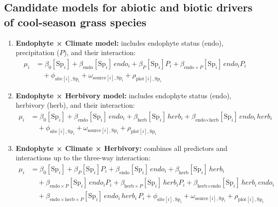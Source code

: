 \documentclass[12pt]{article}\usepackage[]{graphicx}\usepackage[dvipsnames]{xcolor}
\begin{document}
\subsection*{Candidate models for abiotic and biotic drivers of cool-season grass species} \label{sec:models}
\begin{enumerate}
    \item \textbf{Endophyte × Climate model:} includes endophyte status ($\text{endo}$), precipitation ($P$), and their interaction:
    \begin{align*}
    \mu_i &= \beta_0[\text{Sp}_i] + \beta_{\text{endo}}[\text{Sp}_i]\,endo_i + \beta_P[\text{Sp}_i] P_i 
            + \beta_{\text{endo}\times P}[\text{Sp}_i]\,endo_i P_i \\
    &\quad + \phi_{\text{site}[i],\text{Sp}_i} + \omega_{\text{source}[i],\text{Sp}_i} + \rho_{\text{plot}[i],\text{Sp}_i}
    \end{align*}

    \item \textbf{Endophyte × Herbivory model:} includes endophyte status ($\text{endo}$), herbivory ($\text{herb}$), and their interaction:
    \begin{align*}
    \mu_i &= \beta_0[\text{Sp}_i] + \beta_{\text{endo}}[\text{Sp}_i]\,endo_i + \beta_{\text{herb}}[\text{Sp}_i]\,herb_i 
            + \beta_{\text{endo}\times \text{herb}}[\text{Sp}_i]\,endo_i\,herb_i \\
    &\quad + \phi_{\text{site}[i],\text{Sp}_i} + \omega_{\text{source}[i],\text{Sp}_i} + \rho_{\text{plot}[i],\text{Sp}_i}
    \end{align*}

    \item \textbf{Endophyte × Climate × Herbivory:} combines all predictors and interactions up to the three-way interaction:
    \begin{align*}
    \mu_i &= \beta_0[\text{Sp}_i] + \beta_P[\text{Sp}_i] P_i + \beta_{\text{endo}}[\text{Sp}_i]\,endo_i + \beta_{\text{herb}}[\text{Sp}_i]\,herb_i \\
    &\quad + \beta_{\text{endo}\times P}[\text{Sp}_i]\,endo_i P_i 
          + \beta_{\text{herb}\times P}[\text{Sp}_i]\,herb_i P_i
          + \beta_{\text{herb}\times \text{endo}}[\text{Sp}_i]\,herb_i\,endo_i \\
    &\quad + \beta_{\text{endo}\times \text{herb} \times P}[\text{Sp}_i]\,endo_i\,herb_i\,P_i
          + \phi_{\text{site}[i],\text{Sp}_i} + \omega_{\text{source}[i],\text{Sp}_i} + \rho_{\text{plot}[i],\text{Sp}_i}
    \end{align*}
\end{enumerate}
\end{document}
